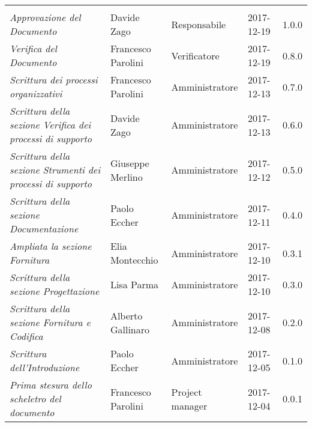 \newpage 
\section*{}
\begin{table}[H]
	\centering
	\begin{tabular}{p{4cm}|C{3cm}|C{3cm}|R{2.5cm}|R{2cm}}
		
		 & & & & \\
		
		
		\emph{Approvazione del Documento} & Davide Zago & Responsabile & 2017-12-19 & 1.0.0 \\
		\hline
		
		\emph{Verifica del Documento} & Francesco Parolini & Verificatore & 2017-12-19 & 0.8.0 \\
		\hline
		
		\emph{Scrittura dei processi organizzativi} & Francesco Parolini & Amministratore & 2017-12-13 & 0.7.0 \\
		\hline
		
		\emph{Scrittura della sezione Verifica dei processi di supporto} & Davide Zago & Amministratore & 2017-12-13 & 0.6.0 \\
		\hline
		
		\emph{Scrittura della sezione Strumenti dei processi di supporto} & Giuseppe Merlino & Amministratore & 2017-12-12 & 0.5.0 \\
		\hline
		
		\emph{Scrittura della sezione Documentazione}& Paolo Eccher & Amministratore & 2017-12-11 & 0.4.0 \\
		\hline
		
		\emph{Ampliata la sezione Fornitura}& Elia Montecchio & Amministratore & 2017-12-10 & 0.3.1 \\
		\hline
		
		\emph{Scrittura della sezione Progettazione} & Lisa Parma & Amministratore & 2017-12-10 & 0.3.0 \\
		\hline
					
		\emph{Scrittura della sezione Fornitura e Codifica} & Alberto Gallinaro & Amministratore & 2017-12-08 & 0.2.0 \\
		\hline
		
		\emph{Scrittura dell'Introduzione} & Paolo Eccher & Amministratore & 2017-12-05 & 0.1.0 \\
		\hline
		
		\emph{Prima stesura dello scheletro del documento} & Francesco Parolini & Project manager & 2017-12-04 & 0.0.1 \\
	

	\end{tabular}
	
\end{table}


\clearpage
